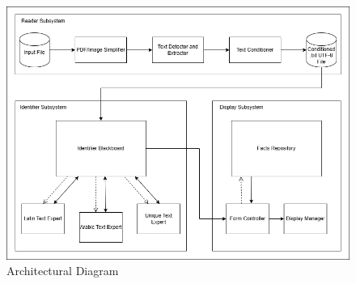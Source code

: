     

\begin{figure}[H]
	\centering
	\includegraphics[width=\linewidth]{Section3/architectural_diagramV2.png}
	\caption{Architectural Diagram}
	\label{ArchitecturalDiagram}
\end{figure}

